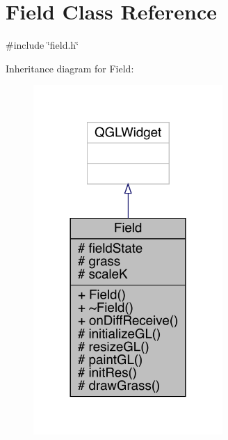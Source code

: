 \hypertarget{a00173}{}\section{Field Class Reference}
\label{a00173}


{\ttfamily \#include \char`\"{}field.\+h\char`\"{}}



Inheritance diagram for Field\+:
\nopagebreak
\begin{figure}[H]
\begin{center}
\leavevmode
\includegraphics[width=204pt]{d6/dfb/a00172}
\end{center}
\end{figure}


